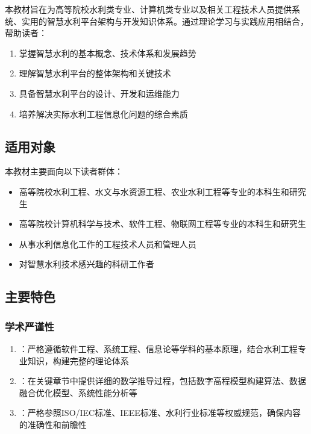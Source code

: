 本教材旨在为高等院校水利类专业、计算机类专业以及相关工程技术人员提供系统、实用的智慧水利平台架构与开发知识体系。通过理论学习与实践应用相结合，帮助读者：

\begin{enumerate}
\def\labelenumi{\arabic{enumi}.}
\tightlist
\item
  掌握智慧水利的基本概念、技术体系和发展趋势
\item
  理解智慧水利平台的整体架构和关键技术
\item
  具备智慧水利平台的设计、开发和运维能力
\item
  培养解决实际水利工程信息化问题的综合素质
\end{enumerate}

\hypertarget{ux9002ux7528ux5bf9ux8c61-2}{%
\subsection{适用对象}\label{ux9002ux7528ux5bf9ux8c61-2}}

本教材主要面向以下读者群体：

\begin{itemize}
\tightlist
\item
  高等院校水利工程、水文与水资源工程、农业水利工程等专业的本科生和研究生
\item
  高等院校计算机科学与技术、软件工程、物联网工程等专业的本科生和研究生
\item
  从事水利信息化工作的工程技术人员和管理人员
\item
  对智慧水利技术感兴趣的科研工作者
\end{itemize}

\hypertarget{ux4e3bux8981ux7279ux8272}{%
\subsection{主要特色}\label{ux4e3bux8981ux7279ux8272}}

\hypertarget{ux5b66ux672fux4e25ux8c28ux6027}{%
\subsubsection{学术严谨性}\label{ux5b66ux672fux4e25ux8c28ux6027}}

\begin{enumerate}
\def\labelenumi{\arabic{enumi}.}
\tightlist
\item
  ：严格遵循软件工程、系统工程、信息论等学科的基本原理，结合水利工程专业知识，构建完整的理论体系
\item
  ：在关键章节中提供详细的数学推导过程，包括数字高程模型构建算法、数据融合优化模型、系统性能分析等
\item
  ：严格参照ISO/IEC标准、IEEE标准、水利行业标准等权威规范，确保内容的准确性和前瞻性
\end{enumerate}

